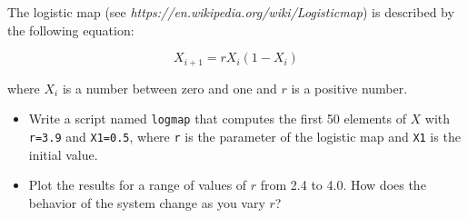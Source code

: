 \begin{ex}
The logistic map (see \emph{https://en.wikipedia.org/wiki/Logistic\textunderscore map}) is described by the following equation:


\begin{equation}
X_{i+1} = r X_i (1-X_i)
\end{equation}

where $X_i$ is a number between zero and one and $r$ is a positive number.

\begin{itemize}

\item Write a script named {\tt logmap} that computes the first 50
elements of $X$ with {\tt r=3.9} and {\tt X1=0.5}, where
{\tt r} is the parameter of the logistic map and {\tt X1} is the
initial value.

\item Plot the results for a range of values of $r$ from 2.4 to 4.0.
How does the behavior of the system change as you vary $r$?

\end{itemize}

\end{ex}



